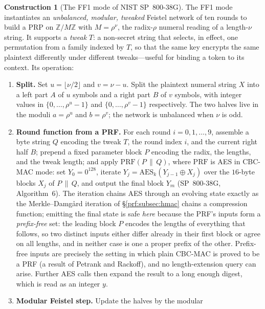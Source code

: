 \documentclass[11pt,a4paper]{article}
\theoremstyle{definition}
\newtheorem{construction}[theorem]{Construction}
\theoremstyle{remark}
\newcommand{\Z}{\ensuremath{\mathbb{Z}}}
\providecommand{\floor}[1]{\lfloor #1 \rfloor}
\begin{document}
\begin{construction}[The FF1 mode of NIST SP~800-38G]
\label{prf:con:ff1}
The FF1 mode instantiates an \emph{unbalanced, modular, tweaked} Feistel
network of ten rounds to build a PRP on \(\Z/M\Z\) with
\(M = \rho^{\nu}\), the radix-\(\rho\) numeral reading of a
length-\(\nu\) string. It supports a \emph{tweak} \(T\): a non-secret
string that selects, in effect, one permutation from a family indexed
by \(T\), so that the same key encrypts the same plaintext differently
under different tweaks---useful for binding a token to its context.
Its operation:
\begin{enumerate}
\item \textbf{Split.} Set \(u = \floor{\nu/2}\) and \(v = \nu - u\).
  Split the plaintext numeral string \(X\) into a left part \(A\) of
  \(u\) symbols and a right part \(B\) of \(v\) symbols, with integer
  values in \(\{0, \dots, \rho^{u} - 1\}\) and
  \(\{0, \dots, \rho^{v} - 1\}\) respectively. The two halves live in
  the moduli \(a = \rho^{u}\) and \(b = \rho^{v}\); the network is
  unbalanced when \(\nu\) is odd.
\item \textbf{Round function from a PRF.} For each round
  \(i = 0, 1, \dots, 9\), assemble a byte string \(Q\) encoding the
  tweak \(T\), the round index \(i\), and the current right half
  \(B\); prepend a fixed parameter block \(P\) encoding the radix, the
  lengths, and the tweak length; and apply
  \(\mathrm{PRF}(P \,\|\, Q)\), where \(\mathrm{PRF}\) is AES in
  CBC-MAC mode: set \(Y_{0} = 0^{128}\), iterate
  \(Y_{j} = \mathrm{AES}_{k}(Y_{j-1} \oplus X_{j})\) over the
  \(16\)-byte blocks \(X_{j}\) of \(P \,\|\, Q\), and output the final
  block \(Y_{m}\) (SP~800-38G, Algorithm~6). The iteration chains AES
  through an evolving state exactly as the Merkle--Damg\aa rd
  iteration of \S\ref{prf:subsec:hmac} chains a compression function;
  emitting the final state is safe \emph{here} because the PRF's
  inputs form a \emph{prefix-free} set: the leading block \(P\)
  encodes the lengths of everything that follows, so two distinct
  inputs either differ already in their first block or agree on all
  lengths, and in neither case is one a proper prefix of the other.
  Prefix-free inputs are precisely the setting in which plain CBC-MAC
  is proved to be a PRF (a result of Petrank and Rackoff), and no
  length-extension query can arise.
  Further AES calls then expand the result to a long enough
  digest, which is read as an integer \(y\).
\item \textbf{Modular Feistel step.} Update the halves by the modular

\end{enumerate}
\end{construction}
\end{document}
